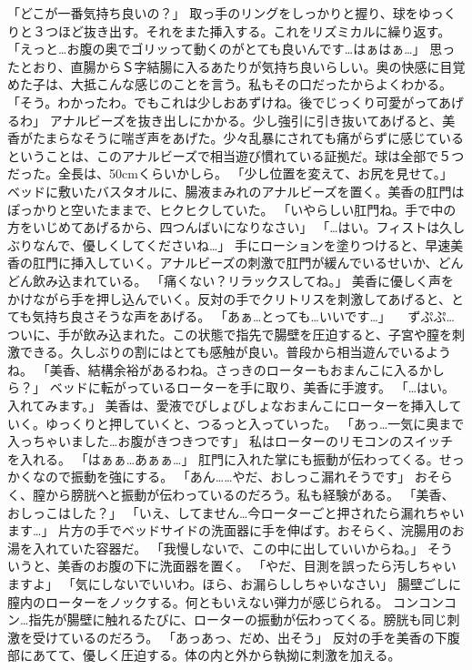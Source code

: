 「どこが一番気持ち良いの？」
取っ手のリングをしっかりと握り、球をゆっくりと３つほど抜き出す。それをまた挿入する。これをリズミカルに繰り返す。
「えっと…お腹の奥でゴリッって動くのがとても良いんです…はぁはぁ…」
思ったとおり、直腸からＳ字結腸に入るあたりが気持ち良いらしい。奥の快感に目覚めた子は、大抵こんな感じのことを言う。私もその口だったからよくわかる。
「そう。わかったわ。でもこれは少しおあずけね。後でじっくり可愛がってあげるわ」
アナルビーズを抜き出しにかかる。少し強引に引き抜いてあげると、美香がたまらなそうに喘ぎ声をあげた。少々乱暴にされても痛がらずに感じているということは、このアナルビーズで相当遊び慣れている証拠だ。球は全部で５つだった。全長は、50cmくらいかしら。
「少し位置を変えて、お尻を見せて。」
ベッドに敷いたバスタオルに、腸液まみれのアナルビーズを置く。美香の肛門はぽっかりと空いたままで、ヒクヒクしていた。
「いやらしい肛門ね。手で中の方をいじめてあげるから、四つんばいになりなさい」
「…はい。フィストは久しぶりなんで、優しくしてくださいね…」
手にローションを塗りつけると、早速美香の肛門に挿入していく。アナルビーズの刺激で肛門が緩んでいるせいか、どんどん飲み込まれている。
「痛くない？リラックスしてね。」
美香に優しく声をかけながら手を押し込んでいく。反対の手でクリトリスを刺激してあげると、とても気持ち良さそうな声をあげる。
「あぁ…とっても…いいです…」
　ずぷぷ…
ついに、手が飲み込まれた。この状態で指先で腸壁を圧迫すると、子宮や膣を刺激できる。久しぶりの割にはとても感触が良い。普段から相当遊んでいるようね。
「美香、結構余裕があるわね。さっきのローターもおまんこに入るかしら？」
ベッドに転がっているローターを手に取り、美香に手渡す。
「…はい。入れてみます。」
美香は、愛液でびしょびしょなおまんこにローターを挿入していく。ゆっくりと押していくと、つるっと入っていった。
「あっ…一気に奥まで入っちゃいました…お腹がきつきつです」
私はローターのリモコンのスイッチを入れる。
「はぁぁ…あぁぁ…」
肛門に入れた掌にも振動が伝わってくる。せっかくなので振動を強にする。
「あん……やだ、おしっこ漏れそうです」
おそらく、膣から膀胱へと振動が伝わっているのだろう。私も経験がある。
「美香、おしっこはした？」
「いえ、してません…今ローターごと押されたら漏れちゃいます…」
片方の手でベッドサイドの洗面器に手を伸ばす。おそらく、浣腸用のお湯を入れていた容器だ。
「我慢しないで、この中に出していいからね。」
そういうと、美香のお腹の下に洗面器を置く。
「やだ、目測を誤ったら汚しちゃいますよ」
「気にしないでいいわ。ほら、お漏らししちゃいなさい」
腸壁ごしに膣内のローターをノックする。何ともいえない弾力が感じられる。
コンコンコン…指先が腸壁に触れるたびに、ローターの振動が伝わってくる。膀胱も同じ刺激を受けているのだろう。
「あっあっ、だめ、出そう」
反対の手を美香の下腹部にあてて、優しく圧迫する。体の内と外から執拗に刺激を加える。
